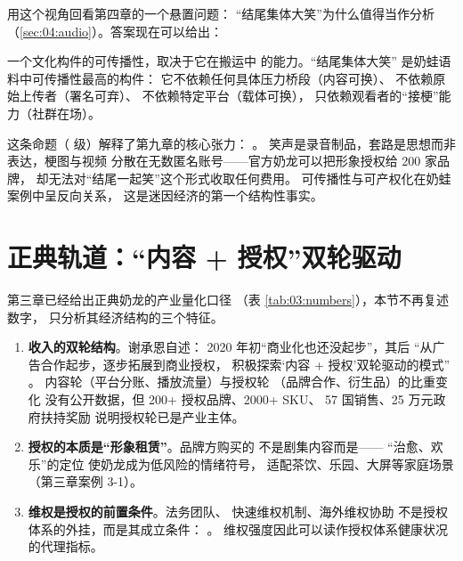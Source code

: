 用这个视角回看第四章的一个悬置问题：
“结尾集体大笑”为什么值得当作分析
（\ref{sec:04:audio}）。答案现在可以给出：

\begin{proposition}\label{prop:09:unit}
  一个文化构件的可传播性，取决于它在搬运中
  的能力。“结尾集体大笑”
  是奶蛙语料中可传播性最高的构件：
  它不依赖任何具体压力桥段（内容可换）、
  不依赖原始上传者（署名可弃）、
  不依赖特定平台（载体可换），
  只依赖观看者的“接梗”能力（社群在场）。
\end{proposition}

这条命题（ 级）解释了第九章的核心张力：
。
笑声是录音制品，套路是思想而非表达，梗图与视频
分散在无数匿名账号——官方奶龙可以把形象授权给 200 家品牌，
却无法对“结尾一起笑”这个形式收取任何费用。
可传播性与可产权化在奶蛙案例中呈反向关系，
这是迷因经济的第一个结构性事实。

\section{正典轨道：“内容 + 授权”双轮驱动}\label{sec:09:canon}

第三章已经给出正典奶龙的产业量化口径
（表 \ref{tab:03:numbers}），本节不再复述数字，
只分析其经济结构的三个特征。

\begin{enumerate}[label=\arabic*.]
  \item \textbf{收入的双轮结构}。谢承恩自述：
        2020 年初“商业化也还没起步”，其后
        “从广告合作起步，逐步拓展到商业授权，
        积极探索‘内容 + 授权’双轮驱动的模式”
        \cite{jiang2026nailong}。
        内容轮（平台分账、播放流量）与授权轮
        （品牌合作、衍生品）的比重变化
        没有公开数据，但 200+ 授权品牌、2000+ SKU、
        57 国销售、25 万元政府扶持奖励
        \cite{jiang2026nailong,chinadaily2026six}
        说明授权轮已是产业主体。
  \item \textbf{授权的本质是“形象租赁”}。品牌方购买的
        不是剧集内容而是——
        “治愈、欢乐”的定位\cite{jiang2026nailong}
        使奶龙成为低风险的情绪符号，
        适配茶饮、乐园、大屏等家庭场景
        （第三章案例 3-1）。
  \item \textbf{维权是授权的前置条件}。法务团队、
        快速维权机制、海外维权协助
        \cite{jiang2026nailong}
        不是授权体系的外挂，而是其成立条件：
        。
        维权强度因此可以读作授权体系健康状况的代理指标。
\end{enumerate}

